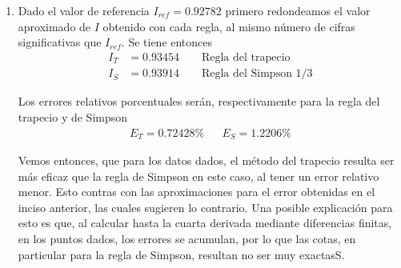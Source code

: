 \begin{problema}
\begin{enumerate}[label=\textbf{\alph*)}]
Hemos resaltado en naranja la segunda y cuarta derivada de valor absoluto más grande. Notemos que en este caso $b=1,\ a=0$ y $n=4$. Entonces 

\begin{align*}
    |E_T|&\approx\frac{1.3692}{12\times 4^2} & |E_S| &\approx \frac{7.4176}{180\times 4^4}\\[1em]
     &\approx 0.00713125 & &\approx 0.000160972
\end{align*}

\item Dado el valor  de referencia $I_{ref}=0.92782$ primero redondeamos el valor aproximado de $I$ obtenido con cada regla, al mismo número de cifras significativas que $I_{ref}$. Se tiene entonces
\begin{align*}
    I_T&=0.93454 \qquad \text{Regla del trapecio}\\[1em]
    I_S&=0.93914\qquad \text{Regla del Simpson 1/3}
\end{align*}

Los errores relativos porcentuales serán, respectivamente para la regla del trapecio y de Simpson
\begin{align*}
    E_T=0.72428\% && E_S=1.2206\%
\end{align*}

Vemos entonces, que para los datos dados, el método del trapecio resulta ser más eficaz que la regla de Simpson en este caso, al tener un error relativo menor. Esto contras con las aproximaciones para el error obtenidas en el inciso anterior, las cuales sugieren lo contrario. Una posible explicación para esto es que, al calcular hasta la cuarta derivada mediante diferencias finitas, en los puntos dados, los errores se acumulan, por lo que las cotas, en particular para la regla de Simpson, resultan no ser muy exactasS.

\end{enumerate}
\end{problema}